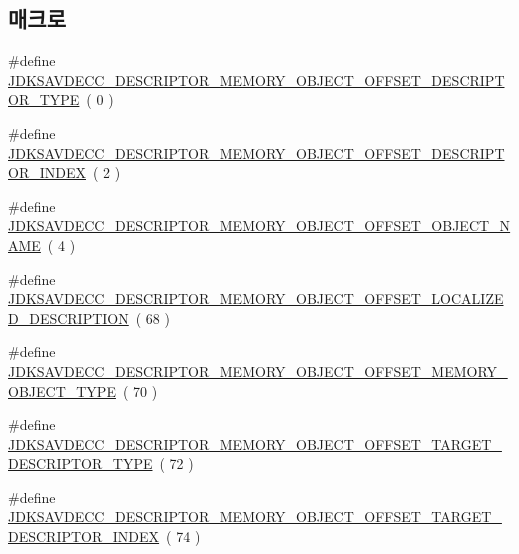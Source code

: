 \subsection*{매크로}
\begin{DoxyCompactItemize}
\item 
\#define \hyperlink{group__descriptor__memory__object_gaf535bc675b3056514997c0ba831a5b6f}{J\+D\+K\+S\+A\+V\+D\+E\+C\+C\+\_\+\+D\+E\+S\+C\+R\+I\+P\+T\+O\+R\+\_\+\+M\+E\+M\+O\+R\+Y\+\_\+\+O\+B\+J\+E\+C\+T\+\_\+\+O\+F\+F\+S\+E\+T\+\_\+\+D\+E\+S\+C\+R\+I\+P\+T\+O\+R\+\_\+\+T\+Y\+PE}~( 0 )
\item 
\#define \hyperlink{group__descriptor__memory__object_ga87b3c2bc203838d734867aa999b68b88}{J\+D\+K\+S\+A\+V\+D\+E\+C\+C\+\_\+\+D\+E\+S\+C\+R\+I\+P\+T\+O\+R\+\_\+\+M\+E\+M\+O\+R\+Y\+\_\+\+O\+B\+J\+E\+C\+T\+\_\+\+O\+F\+F\+S\+E\+T\+\_\+\+D\+E\+S\+C\+R\+I\+P\+T\+O\+R\+\_\+\+I\+N\+D\+EX}~( 2 )
\item 
\#define \hyperlink{group__descriptor__memory__object_ga7d3a6940c26a708f44e0930d6a6c12be}{J\+D\+K\+S\+A\+V\+D\+E\+C\+C\+\_\+\+D\+E\+S\+C\+R\+I\+P\+T\+O\+R\+\_\+\+M\+E\+M\+O\+R\+Y\+\_\+\+O\+B\+J\+E\+C\+T\+\_\+\+O\+F\+F\+S\+E\+T\+\_\+\+O\+B\+J\+E\+C\+T\+\_\+\+N\+A\+ME}~( 4 )
\item 
\#define \hyperlink{group__descriptor__memory__object_ga6b0a0e833e537c28845128ef88f4c95a}{J\+D\+K\+S\+A\+V\+D\+E\+C\+C\+\_\+\+D\+E\+S\+C\+R\+I\+P\+T\+O\+R\+\_\+\+M\+E\+M\+O\+R\+Y\+\_\+\+O\+B\+J\+E\+C\+T\+\_\+\+O\+F\+F\+S\+E\+T\+\_\+\+L\+O\+C\+A\+L\+I\+Z\+E\+D\+\_\+\+D\+E\+S\+C\+R\+I\+P\+T\+I\+ON}~( 68 )
\item 
\#define \hyperlink{group__descriptor__memory__object_ga725612e9df732eca8bc6a1095f6faf51}{J\+D\+K\+S\+A\+V\+D\+E\+C\+C\+\_\+\+D\+E\+S\+C\+R\+I\+P\+T\+O\+R\+\_\+\+M\+E\+M\+O\+R\+Y\+\_\+\+O\+B\+J\+E\+C\+T\+\_\+\+O\+F\+F\+S\+E\+T\+\_\+\+M\+E\+M\+O\+R\+Y\+\_\+\+O\+B\+J\+E\+C\+T\+\_\+\+T\+Y\+PE}~( 70 )
\item 
\#define \hyperlink{group__descriptor__memory__object_gad4bb6f7cf2219bdd579faf1a94c3738c}{J\+D\+K\+S\+A\+V\+D\+E\+C\+C\+\_\+\+D\+E\+S\+C\+R\+I\+P\+T\+O\+R\+\_\+\+M\+E\+M\+O\+R\+Y\+\_\+\+O\+B\+J\+E\+C\+T\+\_\+\+O\+F\+F\+S\+E\+T\+\_\+\+T\+A\+R\+G\+E\+T\+\_\+\+D\+E\+S\+C\+R\+I\+P\+T\+O\+R\+\_\+\+T\+Y\+PE}~( 72 )
\item 
\#define \hyperlink{group__descriptor__memory__object_gabdfaedb41cf9179d646eb6cb6928da1b}{J\+D\+K\+S\+A\+V\+D\+E\+C\+C\+\_\+\+D\+E\+S\+C\+R\+I\+P\+T\+O\+R\+\_\+\+M\+E\+M\+O\+R\+Y\+\_\+\+O\+B\+J\+E\+C\+T\+\_\+\+O\+F\+F\+S\+E\+T\+\_\+\+T\+A\+R\+G\+E\+T\+\_\+\+D\+E\+S\+C\+R\+I\+P\+T\+O\+R\+\_\+\+I\+N\+D\+EX}~( 74 )

\end{DoxyCompactItemize}
